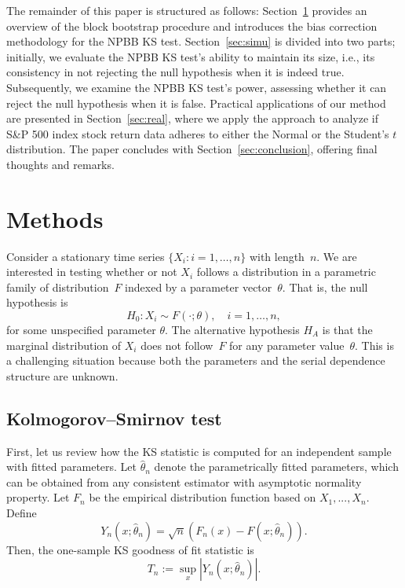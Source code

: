 \documentclass[APA,Times1COL]{WileyNJDv5} %
\begin{document}
The remainder of this paper is structured as follows: 
Section~\ref{sec:methods} provides an overview of the block bootstrap 
procedure and introduces the bias correction methodology for the 
NPBB KS test. Section~\ref{sec:simu} is divided 
into two parts; initially, we evaluate the NPBB KS test's ability to maintain 
its size, i.e., its consistency in not rejecting the null hypothesis when 
it is indeed true. Subsequently, we examine the NPBB KS test's power, assessing 
whether it can reject the null hypothesis when it is false. Practical 
applications of our method are presented in Section~\ref{sec:real}, where 
we apply the approach to analyze if S\&P 500 index stock return
data adheres to either the Normal or the Student's $t$ distribution. The 
paper concludes with Section~\ref{sec:conclusion}, offering final thoughts
and remarks.


\section{Methods}\label{sec:methods}

Consider a stationary time series $\{X_i: i = 1, \ldots, n\}$ with length~$n$.
We are interested in testing whether or not $X_i$ follows a distribution in a
parametric family of distribution~$F$ indexed by a parameter
vector~$\theta$. That is, the null hypothesis is
\[
  H_0: X_i \sim F(\cdot ; \theta), \quad i = 1, \ldots, n,
\]
for some unspecified parameter $\theta$.
The alternative hypothesis $H_A$ is that the marginal distribution of $X_i$ does
not follow~$F$ for any parameter value~$\theta$. This is a challenging situation
because both the parameters and the serial dependence structure are unknown.

\subsection{Kolmogorov--Smirnov test}

First, let us review how the KS statistic is computed for an independent
sample with fitted parameters. Let $\hat\theta_n$ denote the parametrically
fitted parameters, which can be obtained from any consistent estimator with
asymptotic normality property.  Let $F_n$ be the empirical distribution
function based on $X_1,...,X_n$.
Define 
\begin{equation*}
Y_n(x; \hat\theta_n) = \sqrt{n}(F_n(x) - F(x; \hat\theta_n)).
\end{equation*}
Then, the one-sample KS goodness of fit statistic is 
\begin{equation*}
T_n := \sup_x|Y_n(x; \hat\theta_n)|.
\end{equation*}
\end{document}
